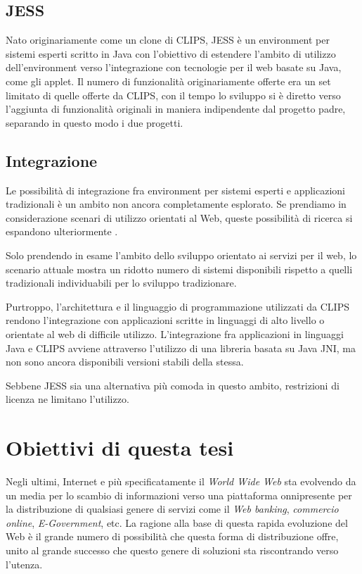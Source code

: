 \subsection{JESS}
Nato originariamente come un clone di CLIPS, JESS è un environment per sistemi esperti scritto in Java con l'obiettivo di estendere l'ambito di utilizzo dell'environment verso l'integrazione con tecnologie per il web basate su Java, come gli applet. Il numero di funzionalità originariamente offerte era un set limitato di quelle offerte da CLIPS, con il tempo lo sviluppo si è diretto verso l'aggiunta di funzionalità originali in maniera indipendente dal progetto padre, separando in questo modo i due progetti.

\subsection{Integrazione}
Le possibilità di integrazione fra environment per sistemi esperti e applicazioni tradizionali è un ambito non ancora completamente esplorato. Se prendiamo in considerazione scenari di utilizzo orientati al Web, queste possibilità di ricerca si espandono ulteriormente .

Solo prendendo in esame l'ambito dello sviluppo orientato ai servizi per il web, lo scenario attuale mostra un ridotto numero di sistemi disponibili rispetto a quelli tradizionali individuabili \cite{dokas2005} per lo sviluppo tradizionare.

Purtroppo, l'architettura e il linguaggio di programmazione utilizzati da CLIPS rendono l'integrazione con applicazioni scritte in linguaggi di alto livello o orientate al web di difficile utilizzo. L'integrazione fra applicazioni in linguaggi Java e CLIPS avviene attraverso l'utilizzo di una libreria basata su Java JNI, ma non sono ancora disponibili versioni stabili della stessa.

Sebbene JESS sia una alternativa più comoda in questo ambito, restrizioni di licenza ne limitano l'utilizzo.

\section{Obiettivi di questa tesi}
Negli ultimi, Internet e più specificatamente il \emph{World Wide Web} sta evolvendo da un media per lo scambio di informazioni verso una piattaforma onnipresente per la distribuzione di qualsiasi genere di servizi come il \emph{Web banking}, \emph{commercio online}, \emph{E-Government}, etc. La ragione alla base di questa rapida evoluzione del Web è il grande numero di possibilità che questa forma di distribuzione offre, unito al grande successo che questo genere di soluzioni sta riscontrando verso l'utenza.

